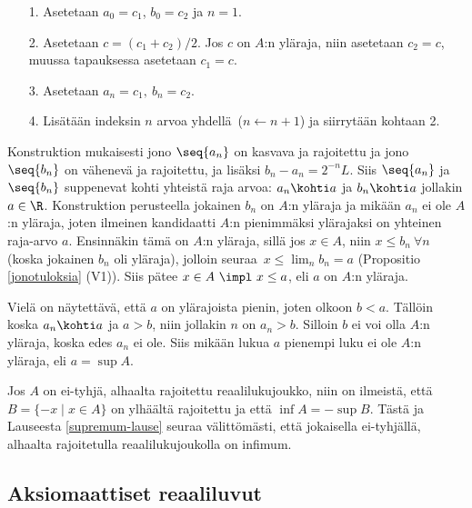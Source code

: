 \begin{itemize}
\item[1.] Asetetaan $a_0=c_1$, $b_0=c_2$ ja $n=1$.
\item[2.] Asetetaan $c = (c_1 + c_2)/2$. Jos $c$ on $A$:n yläraja, niin asetetaan $c_2=c$,
          muussa tapauksessa asetetaan $c_1=c$. 
\item[3.] Asetetaan $a_n=c_1,\ b_n=c_2$.
\item[4.] Lisätään indeksin $n$ arvoa yhdellä\ ($n \leftarrow n+1$) ja siirrytään kohtaan 2.
\end{itemize}
Konstruktion mukaisesti jono $\seq{a_n}$ on kasvava ja rajoitettu ja jono $\seq{b_n}$ on
vähenevä ja rajoitettu, ja lisäksi $b_n-a_n=2^{-n}L$. Siis $\seq{a_n}$ ja $\seq{b_n}$
suppenevat kohti yhteistä raja arvoa: $a_n \kohti a$ ja $b_n \kohti a$ jollakin $a\in\R$.
Konstruktion perusteella jokainen $b_n$ on $A$:n yläraja ja mikään $a_n$ ei ole $A$:n yläraja,
joten ilmeinen kandidaatti $A$:n pienimmäksi ylärajaksi on yhteinen raja-arvo $a$. Ensinnäkin
tämä on $A$:n yläraja, sillä jos $x \in A$, niin $x \le b_n\ \forall n$ (koska jokainen $b_n$ 
oli yläraja), jolloin seuraa $\,x \le \lim_n b_n=a$ (Propositio \ref{jonotuloksia} (V1)).
Siis pätee $x \in A\ \impl\ x \le a$, eli $a$ on $A$:n yläraja.

Vielä on näytettävä, että $a$ on ylärajoista pienin, joten olkoon $b<a$. Tällöin koska 
$a_n \kohti a$ ja $a>b$, niin jollakin $n$ on $a_n>b$. Silloin $b$ ei voi olla $A$:n yläraja, 
koska edes $a_n$ ei ole. Siis mikään lukua $a$ pienempi luku ei ole $A$:n yläraja, eli 
$a=\sup A$. \loppu

Jos $A$ on ei-tyhjä, alhaalta rajoitettu reaalilukujoukko, niin on ilmeistä, että 
$B = \{-x \mid x \in A\}$ on ylhäältä rajoitettu ja että $\inf A = - \sup B$. Tästä ja 
Lauseesta \ref{supremum-lause} seuraa välittömästi, että jokaisella ei-tyhjällä, alhaalta 
rajoitetulla reaalilukujoukolla on infimum.

\subsection*{Aksiomaattiset reaaliluvut}


